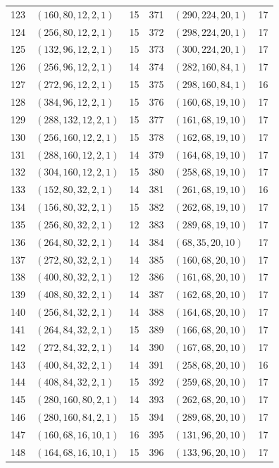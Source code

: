 \begin{longtable}{@{}rlr@{\hspace{12mm}}rlr@{}}
123 & $(160,80,12,2,1)$ & 15 & 371 & $(290,224,20,1)$ & 17\\
124 & $(256,80,12,2,1)$ & 15 & 372 & $(298,224,20,1)$ & 17\\
125 & $(132,96,12,2,1)$ & 15 & 373 & $(300,224,20,1)$ & 17\\
126 & $(256,96,12,2,1)$ & 14 & 374 & $(282,160,84,1)$ & 17\\
127 & $(272,96,12,2,1)$ & 15 & 375 & $(298,160,84,1)$ & 16\\
128 & $(384,96,12,2,1)$ & 15 & 376 & $(160,68,19,10)$ & 17\\
129 & $(288,132,12,2,1)$ & 15 & 377 & $(161,68,19,10)$ & 17\\
130 & $(256,160,12,2,1)$ & 15 & 378 & $(162,68,19,10)$ & 17\\
131 & $(288,160,12,2,1)$ & 14 & 379 & $(164,68,19,10)$ & 17\\
132 & $(304,160,12,2,1)$ & 15 & 380 & $(258,68,19,10)$ & 17\\
133 & $(152,80,32,2,1)$ & 14 & 381 & $(261,68,19,10)$ & 16\\
134 & $(156,80,32,2,1)$ & 15 & 382 & $(262,68,19,10)$ & 17\\
135 & $(256,80,32,2,1)$ & 12 & 383 & $(289,68,19,10)$ & 17\\
136 & $(264,80,32,2,1)$ & 14 & 384 & $(68,35,20,10)$ & 17\\
137 & $(272,80,32,2,1)$ & 14 & 385 & $(160,68,20,10)$ & 17\\
138 & $(400,80,32,2,1)$ & 12 & 386 & $(161,68,20,10)$ & 17\\
139 & $(408,80,32,2,1)$ & 14 & 387 & $(162,68,20,10)$ & 17\\
140 & $(256,84,32,2,1)$ & 14 & 388 & $(164,68,20,10)$ & 17\\
141 & $(264,84,32,2,1)$ & 15 & 389 & $(166,68,20,10)$ & 17\\
142 & $(272,84,32,2,1)$ & 14 & 390 & $(167,68,20,10)$ & 17\\
143 & $(400,84,32,2,1)$ & 14 & 391 & $(258,68,20,10)$ & 16\\
144 & $(408,84,32,2,1)$ & 15 & 392 & $(259,68,20,10)$ & 17\\
145 & $(280,160,80,2,1)$ & 14 & 393 & $(262,68,20,10)$ & 17\\
146 & $(280,160,84,2,1)$ & 15 & 394 & $(289,68,20,10)$ & 17\\
147 & $(160,68,16,10,1)$ & 16 & 395 & $(131,96,20,10)$ & 17\\
148 & $(164,68,16,10,1)$ & 15 & 396 & $(133,96,20,10)$ & 17\\

\end{longtable}
